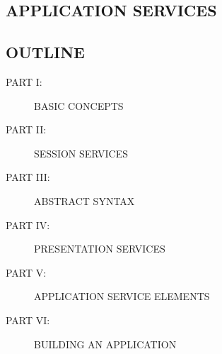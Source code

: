 
\begin{bwslide}
\part	{APPLICATION SERVICES}\bf
\end{bwslide}
\doparts


\begin{bwslide}
\part*	{OUTLINE}\bf

\begin{description}
\item[PART I:]		BASIC CONCEPTS 
\item[PART II:]		SESSION SERVICES
\item[PART III:]	ABSTRACT SYNTAX
\item[PART IV:]		PRESENTATION SERVICES
\item[PART V:]		APPLICATION SERVICE ELEMENTS
\item[PART VI:]		BUILDING AN APPLICATION
\end{description}
\end{bwslide}

%
%
%
%
%





%
%
%
%

